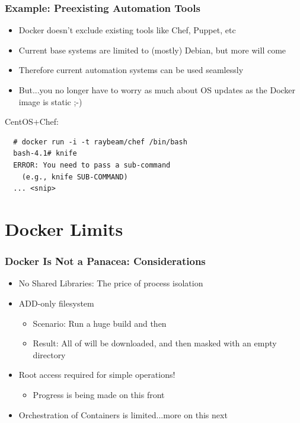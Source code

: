 \documentclass[xcolor=dvipsnames]{beamer}
\begin{document}
\begin{frame}[fragile]
  \frametitle{Example: Preexisting Automation Tools}
  
  \begin{itemize}
    \item Docker doesn't exclude existing tools like Chef, Puppet, etc

    \item Current base systems are limited to (mostly) Debian, but more will come

    \item Therefore current automation systems can be used seamlessly

    \item But...you no longer have to worry as much about OS updates as the 
    Docker image is static ;-)
  \end{itemize}

  CentOS+Chef:
  \begin{lstlisting}
  # docker run -i -t raybeam/chef /bin/bash
  bash-4.1# knife
  ERROR: You need to pass a sub-command 
    (e.g., knife SUB-COMMAND)
  ... <snip>
  \end{lstlisting}

\end{frame}


\section{Docker Limits}

\begin{frame}[fragile]
  \frametitle{Docker Is Not a Panacea: Considerations}

  \begin{itemize}
    \item No Shared Libraries: The price of process isolation
    \item ADD-only filesystem
      \begin{itemize}
        \item Scenario: Run a huge build and then 
        \item Result: All of  will be downloaded, and then masked with an empty directory
      \end{itemize}
    \item Root access required for simple operations!
      \begin{itemize}
        \item Progress is being made on this front
      \end{itemize}
    \item Orchestration of Containers is limited...more on this next
  \end{itemize} 

\end{frame}
\end{document}
